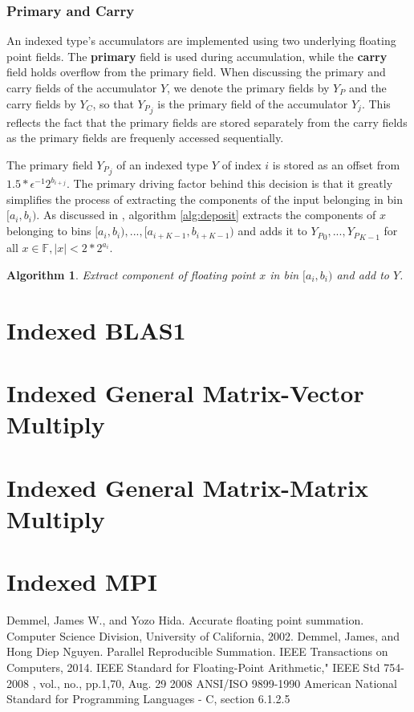 \documentclass[12pt]{article}
\providecommand{\F}{\ensuremath{\mathbb{F}}}
\theoremstyle{plain}
\newtheorem{alg}{Algorithm}[section]
\begin{document}
    \subsubsection{Primary and Carry}
      An indexed type's accumulators are implemented using two underlying floating point fields. The \textbf{primary} field is used during accumulation, while the \textbf{carry} field holds overflow from the primary field. When discussing the primary and carry fields of the accumulator $Y$, we denote the primary fields by $Y_P$ and the carry fields by $Y_C$, so that ${Y_P}_j$ is the primary field of the accumulator $Y_j$. This reflects the fact that the primary fields are stored separately from the carry fields as the primary fields are frequenly accessed sequentially.

      The primary field ${Y_P}_j$ of an indexed type $Y$ of index $i$ is stored as an offset from $1.5 * \epsilon^{-1} 2^{b_{i + j}}$. The primary driving factor behind this decision is that it greatly simplifies the process of extracting the components of the input belonging in bin $[a_i, b_i)$. As discussed in \cite{repsum}, algorithm \ref{alg:deposit} extracts the components of $x$ belonging to bins $[a_i, b_i), ..., [a_{i + K - 1}, b_{i + K - 1})$ and adds it to ${Y_P}_0, ..., {Y_P}_{K - 1}$ for all $x \in \F, |x| < 2 * 2^{a_i}$.
      \begin{alg}
        Extract component of floating point $x$ in bin $[a_i, b_i)$ and add to $Y$.
        \begin{algorithmic}
            
          \EndFunction
        \end{algorithmic}
        \label{alg:extract}
      \end{alg}

\section{Indexed BLAS1}
\section{Indexed General Matrix-Vector Multiply}
\section{Indexed General Matrix-Matrix Multiply}
\section{Indexed MPI}
\begin{thebibliography}{9}
    Demmel, James W., and Yozo Hida. Accurate floating point summation. Computer Science Division, University of California, 2002.
    Demmel, James, and Hong Diep Nguyen. Parallel Reproducible Summation. IEEE Transactions on Computers, 2014.
    IEEE Standard for Floating-Point Arithmetic," IEEE Std 754-2008 , vol., no., pp.1,70, Aug. 29 2008
    ANSI/ISO 9899-1990 American National Standard for Programming Languages - C, section 6.1.2.5
\end{thebibliography}
\end{document}
